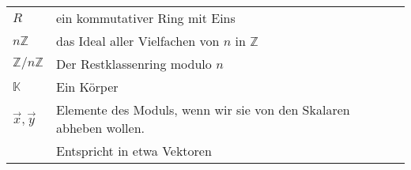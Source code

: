 \documentclass[a4paper]{amsart}
\theoremstyle{definition}
\newcommand{\Z}{\ensuremath{\mathbb{ Z }}}
\newcommand{\K}{\ensuremath{\mathbb{ K }}}
\newcommand{\zz}[1]{\ensuremath{\Z /#1\Z}}
\begin{document}
\renewcommand*{\arraystretch}{1}

\begin{tabular}{ll}
    $R$                                 & ein kommutativer Ring mit Eins\\
    $n\Z$                               & das Ideal aller Vielfachen von $n$ in $\Z$\\
    $\zz{n}$                            & Der Restklassenring modulo $n$\\
    $\K$                                & Ein Körper\\
    $\vec x, \vec y$                    & Elemente des Moduls, wenn wir sie von den Skalaren abheben wollen. \\& Entspricht in etwa Vektoren
\end{tabular}
\end{document}
